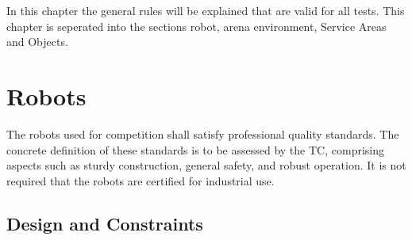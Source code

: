 
In this chapter the general rules will be explained that are valid for all tests. This chapter is seperated into the sections robot, arena environment, Service Areas and Objects.

%
%

\section{Robots}
The robots used for competition shall satisfy professional quality standards. The concrete definition of these standards is to be assessed by the TC, comprising aspects such as sturdy construction, general safety, and robust operation. It is not required that the robots are certified for industrial use.

\subsection{Design and Constraints} \label{ssec:RobotDesignAndConstraints}


